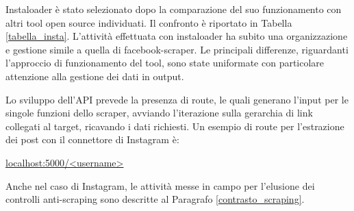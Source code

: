 Instaloader \`e stato selezionato dopo la comparazione del suo funzionamento con altri tool open source individuati. Il confronto \`e riportato in Tabella \ref{tabella_insta}.
L'attivit\`a effettuata con instaloader ha subito una organizzazione e gestione simile a quella di facebook-scraper.
Le principali differenze, riguardanti l'approccio di funzionamento del tool, sono state uniformate con particolare attenzione alla gestione dei dati in output.

Lo sviluppo dell'API prevede la presenza di route, le quali generano l'input per le singole funzioni dello scraper, avviando l'iterazione sulla gerarchia di link collegati al target, ricavando i dati richiesti.
Un esempio di route per l'estrazione dei post con il connettore di Instagram \`e:
\begin{center}
    \url{localhost:5000/<username>}
\end{center}

Anche nel caso di Instagram, le attivit\`a messe in campo per l'elusione dei controlli anti-scraping sono descritte al Paragrafo \ref{contrasto_scraping}.

